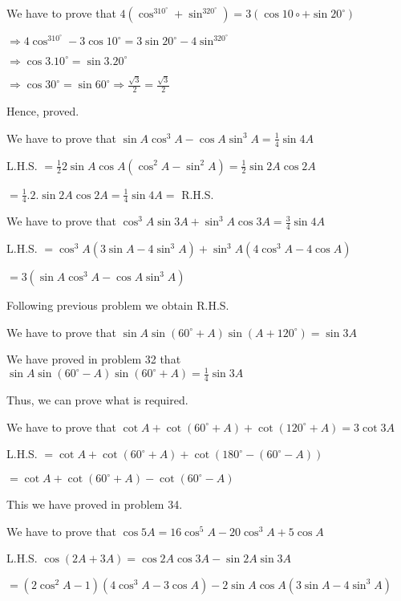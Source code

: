 \item We have to prove that $4(\cos^310^\circ + \sin^320^\circ) = 3(\cos 10\circ + \sin 20^\circ)$

  $\Rightarrow 4\cos^310^\circ - 3\cos10^\circ = 3\sin20^\circ - 4\sin^320^\circ$

  $\Rightarrow \cos 3.10^\circ = \sin 3.20^\circ$

  $\Rightarrow \cos 30^\circ = \sin 60^\circ \Rightarrow \frac{\sqrt{3}}{2} = \frac{\sqrt{3}}{2}$

  Hence, proved.

\item We have to prove that $\sin A\cos^3A - \cos A\sin^3A = \frac{1}{4}\sin 4A$

  L.H.S. $= \frac{1}{2}2\sin A\cos A(\cos^2A - \sin^2A) = \frac{1}{2}\sin2A\cos 2A$

  $= \frac{1}{4}.2.\sin2A\cos 2A = \frac{1}{4}\sin 4A =$ R.H.S.

\item We have to prove that $\cos^3A\sin3A + \sin^3A\cos 3A = \frac{3}{4}\sin 4A$

  L.H.S. $= \cos^3A(3\sin A - 4\sin^3A) + \sin^3A(4\cos^3A - 4\cos A)$

  $= 3(\sin A\cos^3A - \cos A\sin^3A)$

  Following previous problem we obtain R.H.S.

\item We have to prove that $\sin A\sin(60^\circ + A)\sin(A + 120^\circ) = \sin 3A$

  We have proved in problem 32 that $\sin A\sin(60^\circ - A)\sin(60^\circ + A) = \frac{1}{4}\sin 3A$

  Thus, we can prove what is required.

\item We have to prove that $\cot A + \cot(60^\circ + A) + \cot(120^\circ + A) = 3\cot 3A$

  L.H.S. $= \cot A + \cot(60^\circ + A) + \cot(180^\circ - (60^\circ - A))$

  $= \cot A + \cot(60^\circ + A) - \cot(60^\circ - A)$

  This we have proved in problem 34.

\item We have to prove that $\cos 5A = 16\cos^5A - 20\cos^3A + 5\cos A$

  L.H.S. $\cos(2A + 3A) = \cos 2A\cos 3A - \sin2A\sin3A$

  $= (2\cos^2A - 1)(4\cos^3A - 3\cos A) - 2\sin A\cos A(3\sin A - 4\sin^3A)$

